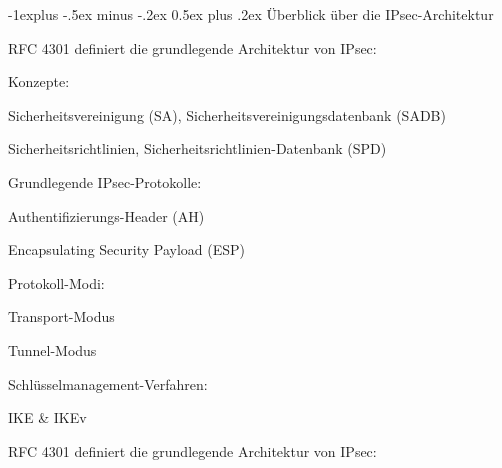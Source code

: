 \documentclass[a4paper]{article}
\makeatletter
\renewcommand{\subsection}{\@startsection{subsection}{2}{0mm}%
 {-1explus -.5ex minus -.2ex}%
 {0.5ex plus .2ex}%
 {\normalfont\normalsize\bfseries}}
\makeatother
\begin{document}
\begin{multicols}{3}


      \subsection{Überblick über die
            IPsec-Architektur}

      \begin{itemize*}
            \item
            RFC 4301 definiert die grundlegende Architektur von IPsec:

            \begin{itemize*}
                  \item Konzepte:
                  \begin{itemize*} \item Sicherheitsvereinigung (SA), Sicherheitsvereinigungsdatenbank (SADB) \item Sicherheitsrichtlinien, Sicherheitsrichtlinien-Datenbank (SPD) \end{itemize*}
                  \item Grundlegende IPsec-Protokolle:
                  \begin{itemize*} \item Authentifizierungs-Header (AH) \item Encapsulating Security Payload (ESP) \end{itemize*}
                  \item Protokoll-Modi:
                  \begin{itemize*} \item Transport-Modus \item Tunnel-Modus \end{itemize*}
                  \item Schlüsselmanagement-Verfahren:
                  \begin{itemize*} \item IKE \& IKEv \end{itemize*}
            \end{itemize*}
            \item
            RFC 4301 definiert die grundlegende Architektur von IPsec:


\end{itemize*}
\end{multicols}
\end{document}
